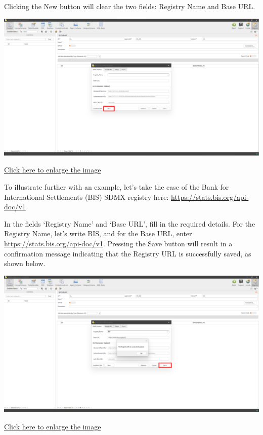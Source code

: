 \documentclass[
]{book}
\begin{document}
Clicking the New button will clear the two fields: Registry Name and Base URL.

\begin{center}\includegraphics[width=1\linewidth]{./images/image236} \end{center}

\href{images/image236.png}{Click here to enlarge the image}

To illustrate further with an example, let's take the case of the Bank for International Settlements (BIS) SDMX registry here: \url{https://stats.bis.org/api-doc/v1}

In the fields `Registry Name' and `Base URL', fill in the required details. For the Registry Name, let's write BIS, and for the Base URL, enter \url{https://stats.bis.org/api-doc/v1}. Pressing the Save button will result in a confirmation message indicating that the Registry URL is successfully saved, as shown below.

\begin{center}\includegraphics[width=1\linewidth]{./images/image237} \end{center}

\href{images/image237.png}{Click here to enlarge the image}
\end{document}
